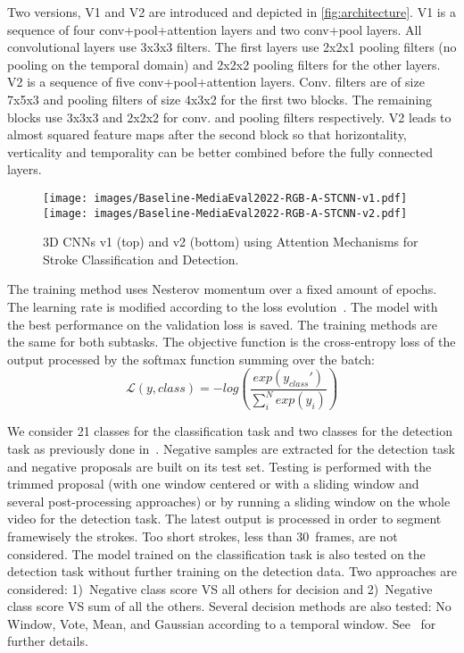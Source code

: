 \documentclass[
]{ceurart}
\begin{document}
\par
Two versions, V1 and V2 are introduced and depicted in \autoref{fig:architecture}. V1 is a sequence of four conv+pool+attention layers and two conv+pool layers. All convolutional layers use 3x3x3 filters. The first layers use 2x2x1 pooling filters (no pooling on the temporal domain) and 2x2x2 pooling filters for the other layers. V2 is a sequence of five conv+pool+attention layers. Conv. filters are of size 7x5x3 and pooling filters of size 4x3x2 for the first two blocks. The remaining blocks use 3x3x3 and 2x2x2 for conv. and pooling filters respectively. V2 leads to almost squared feature maps after the second block so that horizontality, verticality and temporality can be better combined before the fully connected layers.

\begin{figure}
    \centering
    \texttt{[image: images/Baseline-MediaEval2022-RGB-A-STCNN-v1.pdf]}\\
    \texttt{[image: images/Baseline-MediaEval2022-RGB-A-STCNN-v2.pdf]}\\
    \caption{3D CNNs v1 (top) and v2 (bottom) using Attention Mechanisms for Stroke Classification and Detection.}
  \label{fig:architecture}
\end{figure}

\par

The training method uses Nesterov momentum over a fixed amount of epochs. The learning rate is modified according to the loss evolution~\cite{PeICPR:2020}. The model with the best performance on the validation loss is saved. The training methods are the same for both subtasks. The objective function is the cross-entropy loss of the output processed by the softmax function summing over the batch:
\begin{equation}
    \label{eq:CrossEntropyLoss}
    \mathcal{L}(y,class) = -log(\dfrac{exp(y_{class}')}{\sum_i^Nexp(y_i)})
\end{equation}

\par
We consider 21 classes for the classification task and two classes for the detection task as previously done in~\cite{mediaeval/Martin21/baseline}. Negative samples are extracted for the detection task and negative proposals are built on its test set. Testing is performed with the trimmed proposal (with one window centered or with a sliding window and several post-processing approaches) or by running a sliding window on the whole video for the detection task. The latest output is processed in order to segment framewisely the strokes. Too short strokes, less than 30~frames, are not considered. The model trained on the classification task is also tested on the detection task without further training on the detection data. Two approaches are considered: 1)~Negative class score VS all others for decision and 2)~Negative class score VS sum of all the others. Several decision methods are also tested: No Window, Vote, Mean, and Gaussian according to a temporal window. See~\cite{PeThesis2020} for further details.
\end{document}
